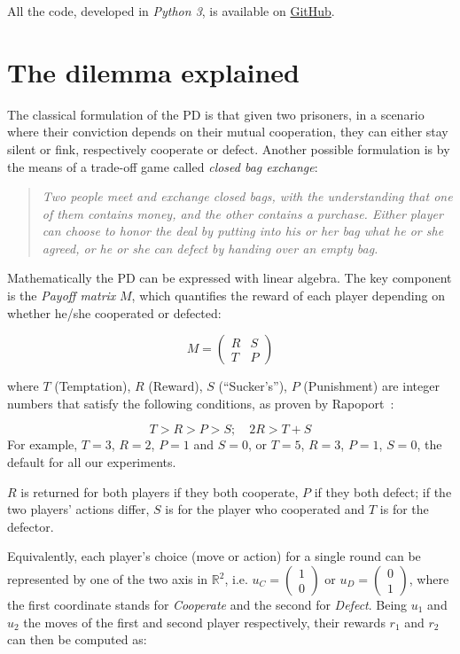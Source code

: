 \documentclass[journal,a4paper,10pt,twoside]{IEEEtran} %
\begin{document}
All the code, developed in \textit{Python 3}, is available on \href{https://github.com/eliabntt/LaboratoryOfComputationalPhysics/tree/Group9}{GitHub}.

\section{The dilemma explained} \label{s:game}
The classical formulation of the PD is that given two prisoners, in a scenario where their conviction depends on their mutual cooperation, they can either stay silent or fink, respectively cooperate or defect.
Another possible formulation is by the means of a trade-off game called \textit{closed bag exchange}:

\begin{quote}
\textit{Two people meet and exchange closed bags, with the understanding that one of them contains money, and the other contains a purchase. Either player can choose to honor the deal by putting into his or her bag what he or she agreed, or he or she can defect by handing over an empty bag.}
\end{quote}

Mathematically the PD can be expressed with linear algebra. The key component is the \textit{Payoff matrix} $M$, which quantifies the reward of each player depending on whether he/she cooperated or defected:

$$
M = 
\begin{pmatrix} 
R & S \\
T & P 
\end{pmatrix}
$$

where $T$ (Temptation), $R$ (Reward), $S$ (``Sucker's''), $P$ (Punishment) are integer numbers that satisfy the following conditions, as proven by Rapoport~\cite{rapoport}:

$$
T>R>P>S; \quad 2R > T+S 
$$
For example, $T=3$, $R=2$, $P=1$ and $S=0$, or  $T=5$, $R=3$, $P=1$, $S=0$, the default for all our experiments. 

$R$ is returned for both players if they both cooperate, $P$ if they both defect; if the two players' actions differ, $S$ is for the player who cooperated and $T$ is for the defector.

Equivalently, each player's choice (move or action) for a single round can be represented by one of the two axis in $\mathbb{R}^2$, i.e. $u_C=\begin{pmatrix} 1 \\ 0 \end{pmatrix}$ or $u_D=\begin{pmatrix} 0 \\ 1 \end{pmatrix}$, where the first coordinate stands for \textit{Cooperate} and the second for \textit{Defect}. Being $u_1$ and $u_2$ the moves of the first and second player respectively, their rewards $r_1$ and $r_2$ can then be computed as:
\end{document}
